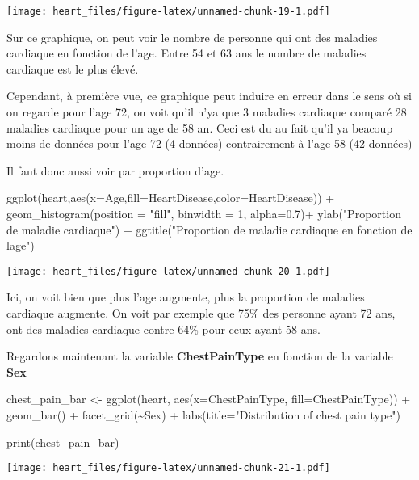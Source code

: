 \documentclass[
]{article}
\newenvironment{Shaded}{\begin{snugshade}}{\end{snugshade}}
\newcommand{\AttributeTok}[1]{\textcolor[rgb]{0.77,0.63,0.00}{#1}}
\newcommand{\DecValTok}[1]{\textcolor[rgb]{0.00,0.00,0.81}{#1}}
\newcommand{\FloatTok}[1]{\textcolor[rgb]{0.00,0.00,0.81}{#1}}
\newcommand{\FunctionTok}[1]{\textcolor[rgb]{0.00,0.00,0.00}{#1}}
\newcommand{\NormalTok}[1]{#1}
\newcommand{\OtherTok}[1]{\textcolor[rgb]{0.56,0.35,0.01}{#1}}
\newcommand{\SpecialCharTok}[1]{\textcolor[rgb]{0.00,0.00,0.00}{#1}}
\newcommand{\StringTok}[1]{\textcolor[rgb]{0.31,0.60,0.02}{#1}}
\begin{document}
\texttt{[image: heart\_files/figure-latex/unnamed-chunk-19-1.pdf]}

Sur ce graphique, on peut voir le nombre de personne qui ont des
maladies cardiaque en fonction de l'age. Entre 54 et 63 ans le nombre de
maladies cardiaque est le plus élevé.

Cependant, à première vue, ce graphique peut induire en erreur dans le
sens où si on regarde pour l'age 72, on voit qu'il n'ya que 3 maladies
cardiaque comparé 28 maladies cardiaque pour un age de 58 an. Ceci est
du au fait qu'il ya beacoup moins de données pour l'age 72 (4 données)
contrairement à l'age 58 (42 données)

Il faut donc aussi voir par proportion d'age.

\begin{Shaded}
\begin{Highlighting}[]
\FunctionTok{ggplot}\NormalTok{(heart,}\FunctionTok{aes}\NormalTok{(}\AttributeTok{x=}\NormalTok{Age,}\AttributeTok{fill=}\NormalTok{HeartDisease,}\AttributeTok{color=}\NormalTok{HeartDisease)) }\SpecialCharTok{+}
\FunctionTok{geom\_histogram}\NormalTok{(}\AttributeTok{position =} \StringTok{"fill"}\NormalTok{, }\AttributeTok{binwidth =} \DecValTok{1}\NormalTok{, }\AttributeTok{alpha=}\FloatTok{0.7}\NormalTok{)}\SpecialCharTok{+}
\FunctionTok{ylab}\NormalTok{(}\StringTok{"Proportion de maladie cardiaque"}\NormalTok{) }\SpecialCharTok{+}
\FunctionTok{ggtitle}\NormalTok{(}\StringTok{"Proportion de maladie cardiaque en fonction de l\textquotesingle{}age"}\NormalTok{)}
\end{Highlighting}
\end{Shaded}

\texttt{[image: heart\_files/figure-latex/unnamed-chunk-20-1.pdf]}

Ici, on voit bien que plus l'age augmente, plus la proportion de
maladies cardiaque augmente. On voit par exemple que 75\% des personne
ayant 72 ans, ont des maladies cardiaque contre 64\% pour ceux ayant 58
ans.

Regardons maintenant la variable \textbf{ChestPainType} en fonction de
la variable \textbf{Sex}

\begin{Shaded}
\begin{Highlighting}[]
\NormalTok{chest\_pain\_bar }\OtherTok{\textless{}{-}} \FunctionTok{ggplot}\NormalTok{(heart, }\FunctionTok{aes}\NormalTok{(}\AttributeTok{x=}\NormalTok{ChestPainType, }\AttributeTok{fill=}\NormalTok{ChestPainType)) }\SpecialCharTok{+}
  \FunctionTok{geom\_bar}\NormalTok{() }\SpecialCharTok{+}
  \FunctionTok{facet\_grid}\NormalTok{(}\SpecialCharTok{\textasciitilde{}}\NormalTok{Sex) }\SpecialCharTok{+}
  \FunctionTok{labs}\NormalTok{(}\AttributeTok{title=}\StringTok{"Distribution of chest pain type"}\NormalTok{)}

\FunctionTok{print}\NormalTok{(chest\_pain\_bar)}
\end{Highlighting}
\end{Shaded}

\texttt{[image: heart\_files/figure-latex/unnamed-chunk-21-1.pdf]}
\end{document}
